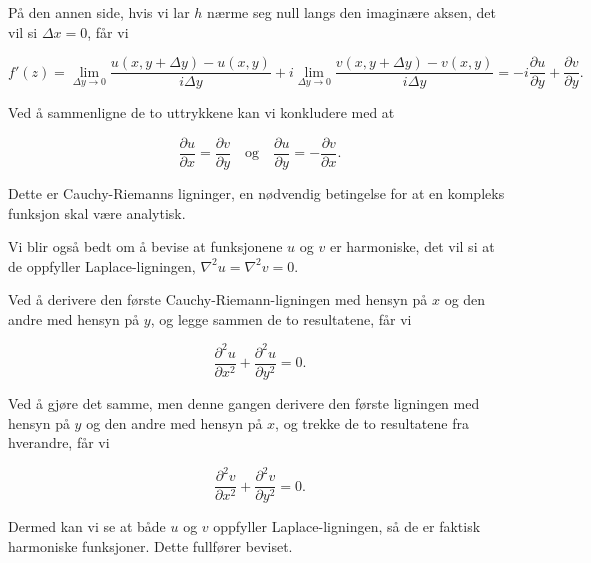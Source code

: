 På den annen side, hvis vi lar $ h $ nærme seg null langs den imaginære aksen, det vil si $ \Delta x = 0 $, får vi

\begin{equation*}
f'(z) = \lim_{\Delta y \to 0} \frac{u(x, y + \Delta y) - u(x, y)}{i \Delta y} + i \lim_{\Delta y \to 0} \frac{v(x, y + \Delta y) - v(x, y)}{i \Delta y} = -i \frac{\partial u}{\partial y} + \frac{\partial v}{\partial y}.
\end{equation*}

Ved å sammenligne de to uttrykkene kan vi konkludere med at

\begin{equation*}
\frac{\partial u}{\partial x} = \frac{\partial v}{\partial y} \quad \text{og} \quad \frac{\partial u}{\partial y} = -\frac{\partial v}{\partial x}.
\end{equation*}

Dette er Cauchy-Riemanns ligninger, en nødvendig betingelse for at en kompleks funksjon skal være analytisk.

Vi blir også bedt om å bevise at funksjonene $ u $ og $ v $ er harmoniske, det vil si at de oppfyller Laplace-ligningen, $ \nabla^2 u = \nabla^2 v = 0 $.

Ved å derivere den første Cauchy-Riemann-ligningen med hensyn på $ x $ og den andre med hensyn på $ y $, og legge sammen de to resultatene, får vi

\begin{equation*}
\frac{\partial^2 u}{\partial x^2} + \frac{\partial^2 u}{\partial y^2} = 0.
\end{equation*}

Ved å gjøre det samme, men denne gangen derivere den første ligningen med hensyn på $ y $ og den andre med hensyn på $ x $, og trekke de to resultatene fra hverandre, får vi

\begin{equation*}
\frac{\partial^2 v}{\partial x^2} + \frac{\partial^2 v}{\partial y^2} = 0.
\end{equation*}

Dermed kan vi se at både $ u $ og $ v $ oppfyller Laplace-ligningen, så de er faktisk harmoniske funksjoner. Dette fullfører beviset.